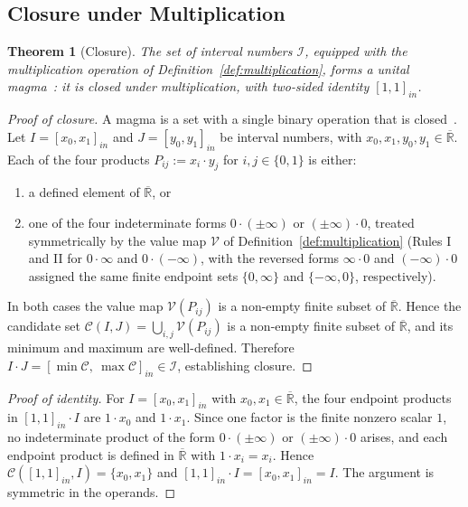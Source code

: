 \documentclass[11pt,a4paper]{article}
\theoremstyle{paperdef}
\newtheorem{theorem}{Theorem}[section]
\newcommand{\Rext}{\overline{\mathbb{R}}}
\newcommand{\Iset}{\mathcal{I}}
\newcommand{\inI}[1]{[#1]_{in}}
\newcommand{\V}{\mathcal{V}}
\newcommand{\Cand}{\mathcal{C}}
\begin{document}
\subsection{Closure under Multiplication}\label{sec:closure}

\begin{theorem}[Closure]\label{thm:closure}
The set of interval numbers $\Iset$, equipped with the multiplication
operation of Definition~\ref{def:multiplication}, forms a
\emph{unital magma}~\cite{MacLaneBirkhoff1999}: it is closed under
multiplication, with two-sided identity $\inI{1, 1}$.
\end{theorem}

\begin{proof}[Proof of closure]
A magma is a set with a single binary operation that is
closed~\cite{Bourbaki1989,MacLaneBirkhoff1999}. Let
$I = \inI{x_0, x_1}$ and $J = \inI{y_0, y_1}$ be interval numbers,
with $x_0, x_1, y_0, y_1 \in \Rext$. Each of the four products
$P_{ij} := x_i \cdot y_j$ for $i, j \in \{0, 1\}$ is either:
\begin{enumerate}[label=(\alph*),leftmargin=2em]
  \item a defined element of $\Rext$, or
  \item one of the four indeterminate forms $0 \cdot (\pm\infty)$ or
    $(\pm\infty) \cdot 0$, treated symmetrically by the value map
    $\V$ of Definition~\ref{def:multiplication} (Rules I and II for
    $0 \cdot \infty$ and $0 \cdot (-\infty)$, with the reversed forms
    $\infty \cdot 0$ and $(-\infty) \cdot 0$ assigned the same finite
    endpoint sets $\{0, \infty\}$ and $\{-\infty, 0\}$, respectively).
\end{enumerate}
In both cases the value map $\V(P_{ij})$ is a non-empty finite subset
of $\Rext$. Hence the candidate set
$\Cand(I, J) = \bigcup_{i,j} \V(P_{ij})$ is a non-empty finite subset
of $\Rext$, and its minimum and maximum are well-defined. Therefore
$I \cdot J = \inI{\min \Cand,\ \max \Cand} \in \Iset$, establishing
closure.
\end{proof}

\begin{proof}[Proof of identity]
For $I = \inI{x_0, x_1}$ with $x_0, x_1 \in \Rext$, the four endpoint
products in $\inI{1, 1} \cdot I$ are $1 \cdot x_0$ and $1 \cdot x_1$.
Since one factor is the finite nonzero scalar $1$, no indeterminate
product of the form $0 \cdot (\pm\infty)$ or $(\pm\infty) \cdot 0$
arises, and each endpoint product is defined in $\Rext$ with
$1 \cdot x_i = x_i$. Hence
$\Cand(\inI{1,1}, I) = \{x_0, x_1\}$ and
$\inI{1, 1} \cdot I = \inI{x_0, x_1} = I$. The argument is symmetric
in the operands.
\end{proof}
\end{document}
